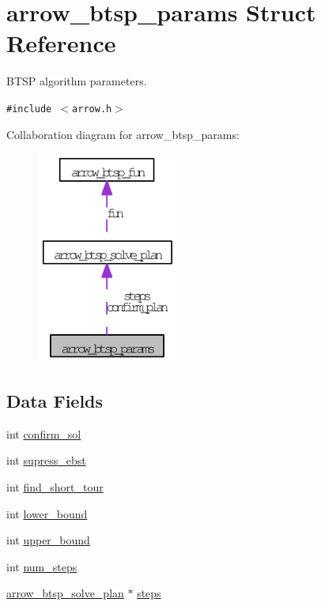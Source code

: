 \hypertarget{structarrow__btsp__params}{
\section{arrow\_\-btsp\_\-params Struct Reference}
\label{structarrow__btsp__params}
}
BTSP algorithm parameters.  


{\tt \#include $<$arrow.h$>$}

Collaboration diagram for arrow\_\-btsp\_\-params:\nopagebreak
\begin{figure}[H]
\begin{center}
\leavevmode
\includegraphics[width=131pt]{structarrow__btsp__params__coll__graph}
\end{center}
\end{figure}
\subsection*{Data Fields}
\begin{CompactItemize}
\item 
int \hyperlink{structarrow__btsp__params_2c579feb3ff41f4d73b5de97596fe465}{confirm\_\-sol}
\item 
int \hyperlink{structarrow__btsp__params_cd85b850ac7c8495a4689100e8c3182c}{supress\_\-ebst}
\item 
int \hyperlink{structarrow__btsp__params_f5fd677200b64930838c6905cbada990}{find\_\-short\_\-tour}
\item 
int \hyperlink{structarrow__btsp__params_da747e3797f9327834e4dbb1459d2786}{lower\_\-bound}
\item 
int \hyperlink{structarrow__btsp__params_b8749004215015a78139b8e4e1fb8905}{upper\_\-bound}
\item 
int \hyperlink{structarrow__btsp__params_2897d24f2fdd53c723609cf68880f55e}{num\_\-steps}
\item 
\hyperlink{structarrow__btsp__solve__plan}{arrow\_\-btsp\_\-solve\_\-plan} $\ast$ \hyperlink{structarrow__btsp__params_49aedb95b2fc4a725e3bb8485470484b}{steps}
\end{CompactItemize}


